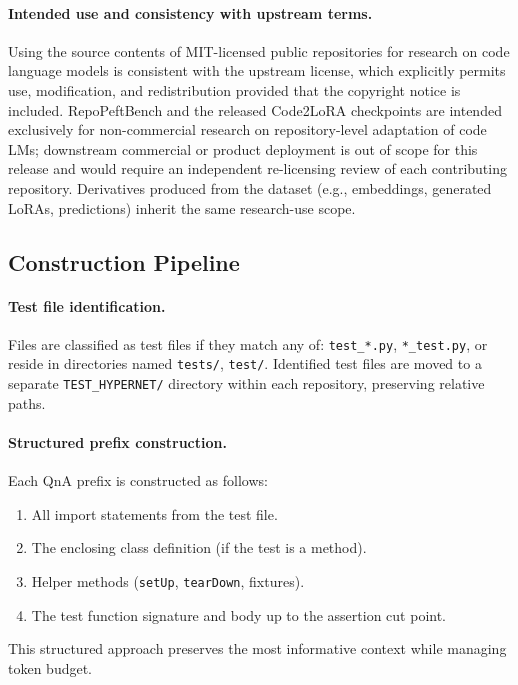 \documentclass{llmxive}
\providecommand{\codelora}{Code2LoRA\xspace}
\providecommand{\repopeftbench}{RepoPeftBench\xspace}
\begin{document}
\paragraph{Intended use and consistency with upstream terms.}
Using the source contents of MIT-licensed public repositories for research on code language models is consistent with the upstream license, which explicitly permits use, modification, and redistribution provided that the copyright notice is included.
\repopeftbench{} and the released \codelora{} checkpoints are intended exclusively for non-commercial research on repository-level adaptation of code LMs; downstream commercial or product deployment is out of scope for this release and would require an independent re-licensing review of each contributing repository.
Derivatives produced from the dataset (e.g., embeddings, generated LoRAs, predictions) inherit the same research-use scope.

\subsection{Construction Pipeline}
\label{app:dataset:pipeline}

\paragraph{Test file identification.}
Files are classified as test files if they match any of:
\texttt{test\_*.py}, \texttt{*\_test.py}, or reside in directories named \texttt{tests/}, \texttt{test/}.
Identified test files are moved to a separate \texttt{TEST\_HYPERNET/} directory within each repository, preserving relative paths.

\paragraph{Structured prefix construction.}
Each QnA prefix is constructed as follows:
\begin{enumerate}[nosep]
\item All import statements from the test file.
\item The enclosing class definition (if the test is a method).
\item Helper methods (\texttt{setUp}, \texttt{tearDown}, fixtures).
\item The test function signature and body up to the assertion cut point.
\end{enumerate}
This structured approach preserves the most informative context while managing token budget.
\end{document}

